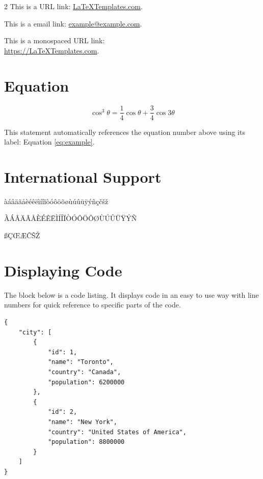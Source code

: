 \documentclass[
	a4paper, %
]{CSMakotoTechnicalReport}
\begin{document}
\begin{multicols}{2}
This is a URL link: \href{https://www.LaTeXTemplates.com}{LaTeXTemplates.com}.

This is a email link: \href{mailto:example@example.com}{example@example.com}.

This is a monospaced URL link:\\ \url{https://LaTeXTemplates.com}.


\section{Equation}

\begin{equation}
	\cos^3 \theta =\frac{1}{4}\cos\theta+\frac{3}{4}\cos 3\theta
	\label{eq:example}
\end{equation}

This statement automatically references the equation number above using its label: Equation \ref{eq:example}.


\section{International Support}

àáâäãåèéêëìíîïòóôöõøùúûüÿýñçčšž

ÀÁÂÄÃÅÈÉÊËÌÍÎÏÒÓÔÖÕØÙÚÛÜŸÝÑ

ßÇŒÆČŠŽ


\section{Displaying Code}

The block below is a code listing. It displays code in an easy to use way with line numbers for quick reference to specific parts of the code.

\begin{lstlisting}
{
	"city": [
		{
			"id": 1,
			"name": "Toronto",
			"country": "Canada",
			"population": 6200000
		},
		{
			"id": 2,
			"name": "New York",
			"country": "United States of America",
			"population": 8800000
		}
	]
}
\end{lstlisting}


\end{multicols}
\end{document}
